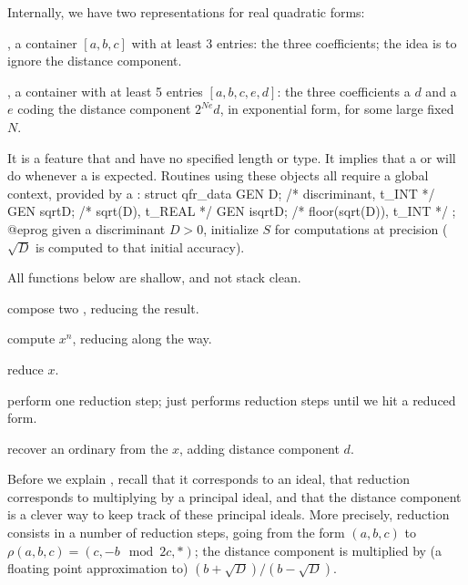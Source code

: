 Internally, we have two representations for real quadratic forms:

\item {}, a container $[a,b,c]$ with at least 3 entries: the three
coefficients; the idea is to ignore the distance component.

\item {}, a container with at least 5 entries $[a,b,c,e,d]$: the
three coefficients a  $d$ and a  $e$ coding the distance
component $2^{Ne} d$, in exponential form, for some large fixed $N$.

It is a feature that  and  have no specified length or
type. It implies that a  or  will do whenever a 
is expected. Routines using these objects all require a global context,
provided by a :
\bprog
  struct qfr_data {
    GEN D;        /* discriminant, t_INT   */
    GEN sqrtD;    /* sqrt(D), t_REAL       */
    GEN isqrtD;   /* floor(sqrt(D)), t_INT */
  };
@eprog
given a discriminant $D > 0$, initialize $S$ for computations at precision
 ($\sqrt{D}$ is computed to that initial accuracy).

\noindent All functions below are shallow, and not stack clean.

 compose two
, reducing the result.

 compute $x^n$, reducing
along the way.

 reduce $x$.

 perform one reduction step;
 just performs reduction steps until we hit a reduced form.

 recover an ordinary  from the
 $x$, adding distance component $d$.

Before we explain , recall that it corresponds to an ideal, that
reduction corresponds to multiplying by a principal ideal, and that the
distance component is a clever way to keep track of these principal ideals.
More precisely, reduction consists in a number of reduction steps,
going from the form $(a,b,c)$ to $\rho(a,b,c) = (c, -b \mod 2c, *)$;
the distance component is multiplied by (a floating point approximation to)
$(b + \sqrt{D}) / (b - \sqrt{D})$.

